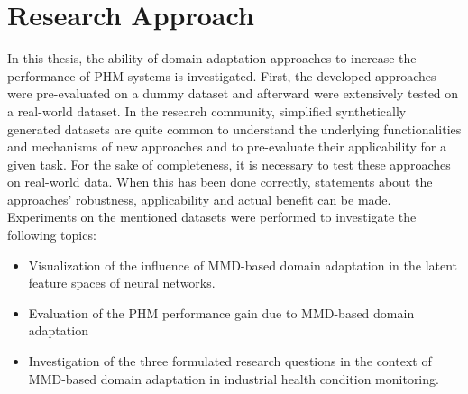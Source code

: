\section{Research Approach}
In this thesis, the ability of domain adaptation approaches to increase the performance of PHM systems is investigated. First, the developed approaches were pre-evaluated on a dummy dataset and afterward were extensively tested on a real-world dataset. In the research community, simplified synthetically generated datasets are quite common to understand the underlying functionalities and mechanisms of new approaches and to pre-evaluate their applicability for a given task. For the sake of completeness, it is necessary to test these approaches on real-world data. When this has been done correctly, statements about the approaches' robustness, applicability and actual benefit can be made. Experiments on the mentioned datasets were performed to investigate the following topics:
\begin{itemize}
    \item Visualization of the influence of MMD-based domain adaptation in the latent feature spaces of neural networks.
    \item Evaluation of the PHM performance gain due to MMD-based domain adaptation
    \item Investigation of the three formulated research questions in the context of MMD-based domain adaptation in industrial health condition monitoring.
\end{itemize}

